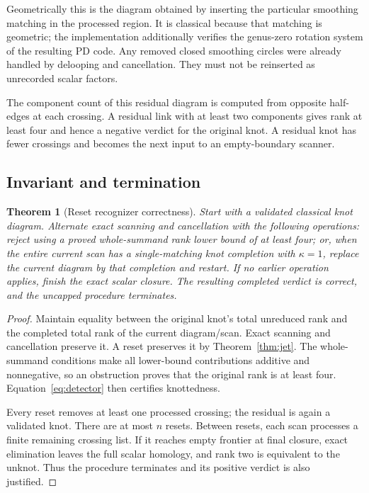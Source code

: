\documentclass[11pt]{article}
\newtheorem{theorem}{Theorem}[section]
\theoremstyle{definition}\newtheorem{definition}[theorem]{Definition}\newtheorem{example}[theorem]{Example}
\theoremstyle{remark}\newtheorem{remark}[theorem]{Remark}
\begin{document}
Geometrically this is the diagram obtained by inserting the particular smoothing matching in the processed region. It is classical because that matching is geometric; the implementation additionally verifies the genus-zero rotation system of the resulting PD code. Any removed closed smoothing circles were already handled by delooping and cancellation. They must not be reinserted as unrecorded scalar factors.

The component count of this residual diagram is computed from opposite half-edges at each crossing. A residual link with at least two components gives rank at least four and hence a negative verdict for the original knot. A residual knot has fewer crossings and becomes the next input to an empty-boundary scanner.

\subsection{Invariant and termination}
\begin{theorem}[Reset recognizer correctness]\label{thm:correct}
Start with a validated classical knot diagram. Alternate exact scanning and cancellation with the following operations: reject using a proved whole-summand rank lower bound of at least four; or, when the entire current scan has a single-matching knot completion with $\kappa=1$, replace the current diagram by that completion and restart. If no earlier operation applies, finish the exact scalar closure. The resulting completed verdict is correct, and the uncapped procedure terminates.
\end{theorem}
\begin{proof}
Maintain equality between the original knot's total unreduced rank and the completed total rank of the current diagram/scan. Exact scanning and cancellation preserve it. A reset preserves it by Theorem~\ref{thm:jet}. The whole-summand conditions make all lower-bound contributions additive and nonnegative, so an obstruction proves that the original rank is at least four. Equation~\eqref{eq:detector} then certifies knottedness.

Every reset removes at least one processed crossing; the residual is again a validated knot. There are at most $n$ resets. Between resets, each scan processes a finite remaining crossing list. If it reaches empty frontier at final closure, exact elimination leaves the full scalar homology, and rank two is equivalent to the unknot. Thus the procedure terminates and its positive verdict is also justified.
\end{proof}
\end{document}
